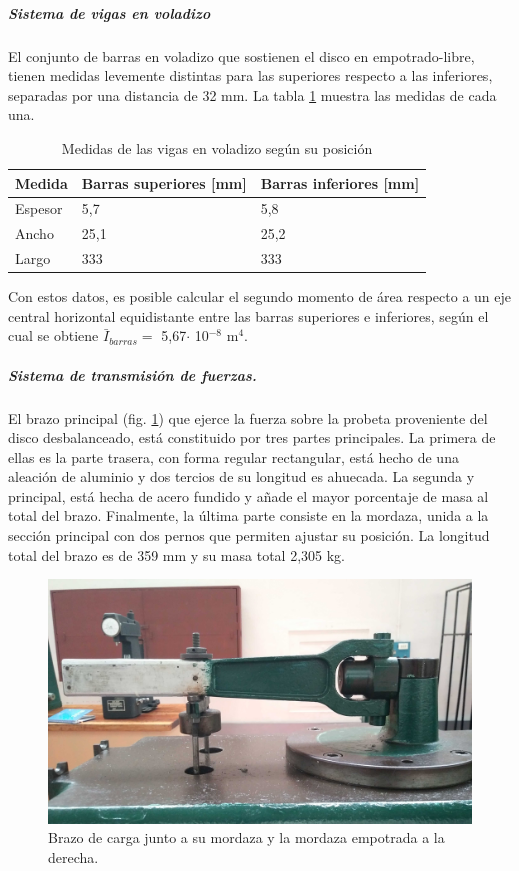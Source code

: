 \subparagraph{Sistema de vigas en voladizo}
El conjunto de barras en voladizo que sostienen el disco en empotrado-libre, tienen medidas levemente distintas para las superiores respecto a las inferiores, separadas por una distancia de 32 mm. La tabla \ref{tab:medidas_barrasacero} muestra las medidas de cada una.
\begin{table}[h]
\centering
\begin{tabular}{@{}lll@{}}
\toprule
Medida  & Barras superiores {[}mm{]} & Barras inferiores {[}mm{]} \\ \midrule
Espesor      & 5,7                        & 5,8                        \\
Ancho        & 25,1                       & 25,2                       \\
Largo        & 333                        & 333                        \\ \bottomrule
\end{tabular}
\caption{Medidas de las vigas en voladizo según su posición}
\label{tab:medidas_barrasacero}
\end{table}

Con estos datos, es posible calcular el segundo momento de área respecto a un eje central horizontal equidistante entre las barras superiores e inferiores, según el cual se obtiene $\bar{I}_{barras}=$ 5,67$\cdot$ 10$^{-8} \text{ m}^4$. 

\subparagraph{Sistema de transmisión de fuerzas.}
El brazo principal (fig. \ref{fig:brazo_carga}) que ejerce la fuerza sobre la probeta proveniente del disco desbalanceado, está constituido por tres partes principales. La primera de ellas es la parte trasera, con forma regular rectangular, está hecho de una aleación de aluminio y dos tercios de su longitud es ahuecada. La segunda y principal, está hecha de acero fundido y añade el mayor porcentaje de masa al total del brazo. Finalmente, la última parte consiste en la mordaza, unida a la sección principal con dos pernos que permiten ajustar su posición. La longitud total del brazo es de 359 mm y su masa total 2,305 kg.

\begin{figure}[h]
\centering
\includegraphics[width=0.9\linewidth]{Imagenes/brazo_carga.jpg}
\caption{Brazo de carga junto a su mordaza y la mordaza empotrada a la derecha.}
\label{fig:brazo_carga}
\end{figure}

